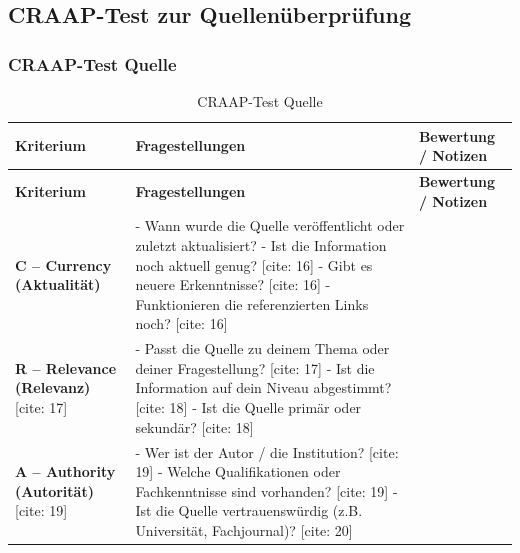 \subsection*{CRAAP-Test zur Quellenüberprüfung}

\subsubsection*{CRAAP-Test Quelle \cite{zahorulko_ai_2025}}
\begin{longtable}{|>{\raggedright\arraybackslash}p{3cm}|>{\raggedright\arraybackslash}p{6cm}|>{\raggedright\arraybackslash}p{7cm}|}

\caption{CRAAP-Test Quelle \cite{zahorulko_ai_2025}} \label{tab:craap-zahorulko-ai} \\ 
\hline
\textbf{Kriterium} & \textbf{Fragestellungen} & \textbf{Bewertung / Notizen} \\
\hline
\endfirsthead

\hline
\textbf{Kriterium} & \textbf{Fragestellungen} & \textbf{Bewertung / Notizen} \\
\hline
\endhead

\textbf{C – Currency (Aktualität)}  &
- Wann wurde die Quelle veröffentlicht oder zuletzt aktualisiert?  \newline
- Ist die Information noch aktuell genug? [cite: 16] \newline
- Gibt es neuere Erkenntnisse? [cite: 16] \newline
- Funktionieren die referenzierten Links noch? [cite: 16] &
\\ \hline

\textbf{R – Relevance (Relevanz)} [cite: 17] &
- Passt die Quelle zu deinem Thema oder deiner Fragestellung? [cite: 17] \newline
- Ist die Information auf dein Niveau abgestimmt? [cite: 18] \newline
- Ist die Quelle primär oder sekundär? [cite: 18] &
\\ \hline

\textbf{A – Authority (Autorität)} [cite: 19] &
- Wer ist der Autor / die Institution? [cite: 19] \newline
- Welche Qualifikationen oder Fachkenntnisse sind vorhanden? [cite: 19] \newline
- Ist die Quelle vertrauenswürdig (z.B. Universität, Fachjournal)? [cite: 20] &
\\ \hline


\end{longtable}
